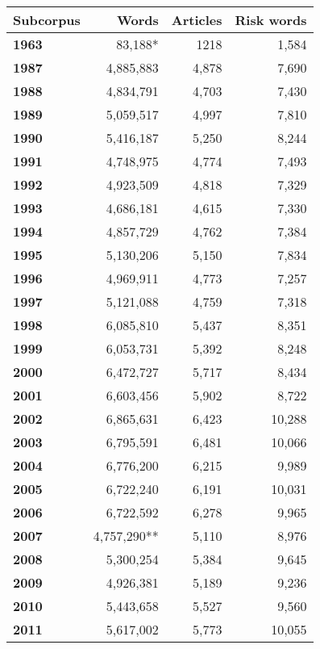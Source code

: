 \begin{table}
\centering
\footnotesize
\begin{tabular}{p{1.5cm}rrr}

\toprule
\textbf{Subcorpus} & \textbf{Words} & \textbf{Articles} & \textbf{Risk words}  \\ \midrule
\textbf{1963} & 83,188* & 1218 &  1,584  \\ 
\textbf{1987} & 4,885,883 & 4,878 &  7,690  \\ 
\textbf{1988} & 4,834,791 & 4,703 &  7,430  \\ 
\textbf{1989} & 5,059,517 & 4,997 &  7,810  \\ 
\textbf{1990} & 5,416,187 & 5,250 &  8,244  \\ 
\textbf{1991} & 4,748,975 & 4,774 &  7,493  \\ 
\textbf{1992} & 4,923,509 & 4,818 &  7,329  \\ 
\textbf{1993} & 4,686,181 & 4,615 &  7,330  \\ 
\textbf{1994} & 4,857,729 & 4,762 &  7,384  \\ 
\textbf{1995} & 5,130,206 & 5,150 &  7,834  \\ 
\textbf{1996} & 4,969,911 & 4,773 &  7,257  \\ 
\textbf{1997} & 5,121,088 & 4,759 &  7,318  \\ 
\textbf{1998} & 6,085,810 & 5,437 &  8,351  \\ 
\textbf{1999} & 6,053,731 & 5,392 &  8,248  \\ 
\textbf{2000} & 6,472,727 & 5,717 &  8,434  \\ 
\textbf{2001} & 6,603,456 & 5,902 &  8,722  \\ 
\textbf{2002} & 6,865,631 & 6,423 & 10,288  \\ 
\textbf{2003} & 6,795,591 & 6,481 & 10,066  \\ 
\textbf{2004} & 6,776,200 & 6,215 &  9,989  \\ 
\textbf{2005} & 6,722,240 & 6,191 & 10,031  \\ 
\textbf{2006} & 6,722,592 & 6,278 &  9,965  \\ 
\textbf{2007} & 4,757,290** & 5,110 &  8,976  \\ 
\textbf{2008} & 5,300,254 & 5,384 &  9,645  \\ 
\textbf{2009} & 4,926,381 & 5,189 &  9,236  \\ 
\textbf{2010} & 5,443,658 & 5,527 &  9,560  \\ 
\textbf{2011} & 5,617,002 & 5,773 & 10,055  \\ 

\end{tabular}
\end{table}
